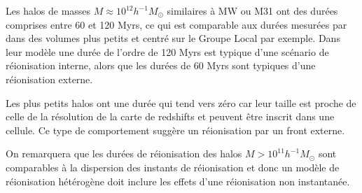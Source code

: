 Les halos de masses $M \approx 10^{12} h^{-1}M_\odot$ similaires à MW ou M31 ont des durées comprises entre 60 et 120 Myrs, ce qui est comparable aux durées mesurées par \cite{ocvirk_reionization_2014} dans des volumes plus petits et centré sur le Groupe Local par exemple.
Dans leur modèle une durée de l'ordre de 120 Myrs est typique d'une scénario de réionisation interne, alors que les durées de 60 Myrs sont typiques d'une réionisation externe.

Les plus petits halos ont une durée qui tend vers zéro car leur taille est proche de celle de la résolution de la carte de redshifts et peuvent être inscrit dans une cellule.
Ce type de comportement suggère un réionisation par un front externe.

On remarquera que les durées de réionisation des halos $M > 10^{11} h^{-1}M_\odot$ sont comparables à la dispersion des instants de réionisation et donc un modèle de réionisation hétérogène doit inclure les effets d'une réionisation non instantanée.




%
%


